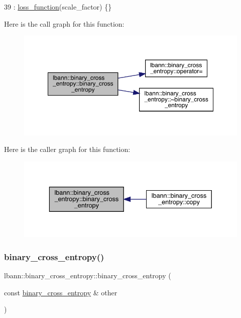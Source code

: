 \begin{DoxyCode}
39     : \hyperlink{classlbann_1_1loss__function_a0c5745e661c59e3e5496888d233c07cf}{loss\_function}(scale\_factor) \{\}
\end{DoxyCode}
Here is the call graph for this function\+:\nopagebreak
\begin{figure}[H]
\begin{center}
\leavevmode
\includegraphics[width=350pt]{classlbann_1_1binary__cross__entropy_ad142f09272d2572c34812dc6bbc54434_cgraph}
\end{center}
\end{figure}
Here is the caller graph for this function\+:\nopagebreak
\begin{figure}[H]
\begin{center}
\leavevmode
\includegraphics[width=336pt]{classlbann_1_1binary__cross__entropy_ad142f09272d2572c34812dc6bbc54434_icgraph}
\end{center}
\end{figure}
\mbox{\label{classlbann_1_1binary__cross__entropy_a2afe78604e320beef2af10bcdb95a02a}} 
\subsubsection{\texorpdfstring{binary\+\_\+cross\+\_\+entropy()}{binary\_cross\_entropy()}\hspace{0.1cm}{\footnotesize\ttfamily [2/2]}}
{\footnotesize\ttfamily lbann\+::binary\+\_\+cross\+\_\+entropy\+::binary\+\_\+cross\+\_\+entropy (\begin{DoxyParamCaption}\item[{const \hyperlink{classlbann_1_1binary__cross__entropy}{binary\+\_\+cross\+\_\+entropy} \&}]{other }\end{DoxyParamCaption})\hspace{0.3cm}{\ttfamily [default]}}


